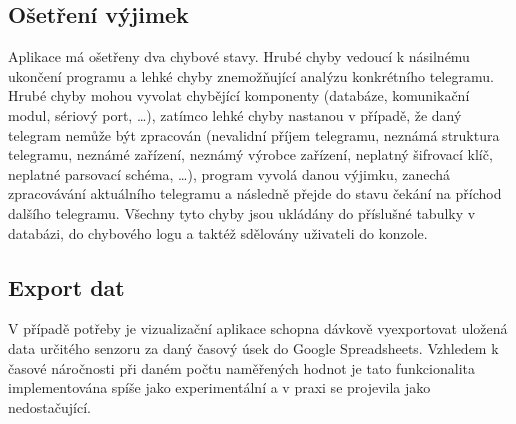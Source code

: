 \subsection{Ošetření výjimek}
Aplikace má ošetřeny dva chybové stavy. Hrubé chyby vedoucí k násilnému ukončení programu a lehké chyby znemožňující analýzu konkrétního telegramu. Hrubé chyby mohou vyvolat chybějící komponenty (databáze, komunikační modul, sériový port, \ldots), zatímco lehké chyby nastanou v případě, že daný telegram nemůže být zpracován (nevalidní příjem telegramu, neznámá struktura telegramu, neznámé zařízení, neznámý výrobce zařízení, neplatný šifrovací klíč, neplatné parsovací schéma, \ldots ), program vyvolá danou výjimku, zanechá zpracovávání aktuálního telegramu a následně přejde do stavu čekání na příchod dalšího telegramu.
Všechny tyto chyby jsou ukládány do příslušné tabulky v databázi, do chybového logu a taktéž sdělovány uživateli do konzole.

\subsection{Export dat}
V případě potřeby je vizualizační aplikace schopna dávkově vyexportovat uložená data určitého senzoru za daný časový úsek do Google Spreadsheets. Vzhledem k časové náročnosti při daném počtu naměřených hodnot je tato funkcionalita implementována spíše jako experimentální a v praxi se projevila jako nedostačující.


